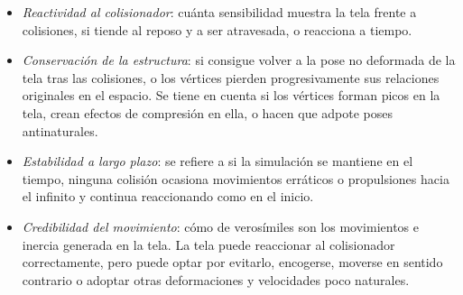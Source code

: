 \begin{itemize}
  \begin{itemize}
    \item \textit{Reactividad al colisionador}: cuánta sensibilidad muestra la tela frente a colisiones, si tiende al reposo y a ser atravesada, o reacciona a tiempo.
    \item \textit{Conservación de la estructura}: si consigue volver a la pose no deformada de la tela tras las colisiones, o los vértices pierden progresivamente sus relaciones originales en el espacio. Se tiene en cuenta si los vértices forman picos en la tela, crean efectos de compresión en ella, o hacen que adpote poses antinaturales.
    \item \textit{Estabilidad a largo plazo}: se refiere a si la simulación se mantiene en el tiempo, ninguna colisión ocasiona movimientos erráticos o propulsiones hacia el infinito y continua reaccionando como en el inicio.
    \item \textit{Credibilidad del movimiento}: cómo de verosímiles son los movimientos e inercia generada en la tela. La tela puede reaccionar al colisionador correctamente, pero puede optar por evitarlo, encogerse, moverse en sentido contrario o adoptar otras deformaciones y velocidades poco naturales. 
  \end{itemize}

\end{itemize}
